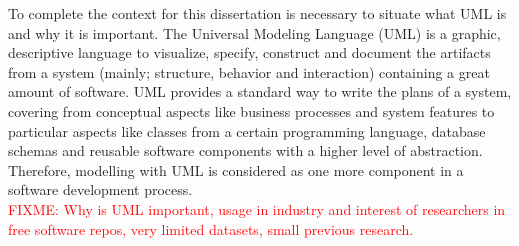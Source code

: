 \documentclass[a4paper, 12pt]{book}
\begin{document}
To complete the context for this dissertation is necessary to situate what UML is and why it is important.
The Universal Modeling Language (UML) is a graphic, descriptive language to visualize, specify, construct and document the
artifacts from a system (mainly; structure, behavior and interaction) containing a great amount of software.
UML provides a standard way to write the plans of a system, covering from conceptual aspects like business processes and
system features to particular aspects like classes from a certain programming language, database schemas and reusable
software components with a higher level of abstraction. Therefore, modelling with UML is considered as one more component
in a software development process.\\
\textcolor{red}{FIXME: Why is UML important, usage in industry and interest of researchers in free software repos,
very limited datasets, small previous research.}
\end{document}
